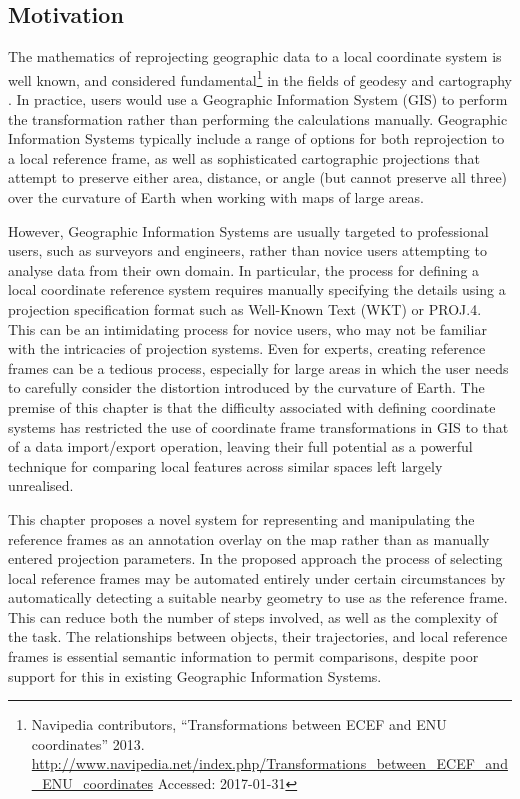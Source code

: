 
\subsection{Motivation}

The mathematics of reprojecting geographic data to a local coordinate
system is well known, and considered fundamental\footnote{Navipedia
  contributors, ``Transformations between ECEF and ENU coordinates''
  2013.
  \url{http://www.navipedia.net/index.php/Transformations\_between\_ECEF\_and\_ENU\_coordinates}
  Accessed: 2017-01-31} in the fields of geodesy and cartography
\cite{drake_converting_2002, noureldin_basic_2013}. In practice,
users would use a Geographic Information System (GIS) to perform the
transformation rather than performing the calculations manually.
Geographic Information Systems typically include a range of options for
both reprojection to a local reference frame, as well as
sophisticated cartographic projections that attempt to preserve either
area, distance, or angle (but cannot preserve all three) over the
curvature of Earth when working with maps of large areas.

However, Geographic Information Systems are usually targeted to
professional users, such as surveyors and engineers, rather than novice
users attempting to analyse data from their own domain. In particular,
the process for defining a local coordinate reference system requires
manually specifying the details using a projection specification format
such as Well-Known Text (WKT) or PROJ.4. This can be an intimidating
process for novice users, who may not be familiar with the intricacies
of projection systems. Even for experts, creating reference frames can
be a tedious process, especially for large areas in which the user needs
to carefully consider the distortion introduced by the curvature of
Earth. The premise of this chapter is that the difficulty associated with defining coordinate
systems has restricted the use of coordinate frame transformations in
GIS to that of a data import/export operation, leaving their full
potential as a powerful technique for comparing local features across
similar spaces left largely unrealised.


This chapter proposes a novel system for representing and manipulating the
reference frames as an annotation overlay on the map rather than as
manually entered projection parameters. In the proposed approach the process of
selecting local reference frames may be automated entirely under certain
circumstances by automatically detecting a suitable nearby geometry to
use as the reference frame. This can reduce both
the number of steps involved, as well as the complexity of the task. The relationships between objects, their trajectories,
and local reference frames is essential semantic information to permit
comparisons, despite poor support for this in existing Geographic
Information Systems. %

